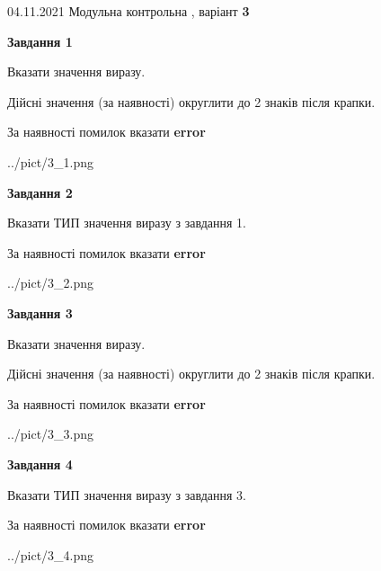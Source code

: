 \documentclass[11pt, ukrainian]{article}
\begin{document}
{04.11.2021 Модульна контрольна , варіант  \No \textbf { 3 }\par}
{
\begin {large}
{\begin {center}\textbf{Завдання 1}\end {center}}\par
Вказати значення виразу. \par
Дійсні значення (за наявності) округлити до 2 знаків після крапки. \par
За наявності помилок вказати \textbf{error}

\begin{center}
	{../pict/3_1.png}
\end{center}
\newpage

{\begin {center}\textbf{Завдання 2}\end {center}}\par
Вказати ТИП значення виразу з завдання 1. \par
За наявності помилок вказати \textbf{error}

\begin{center}
	{../pict/3_2.png}
\end{center}
\newpage

{\begin {center}\textbf{Завдання 3}\end {center}}\par
Вказати значення виразу. \par
Дійсні значення (за наявності) округлити до 2 знаків після крапки. \par
За наявності помилок вказати \textbf{error}

\begin{center}
	{../pict/3_3.png}
\end{center}
\newpage

{\begin {center}\textbf{Завдання 4}\end {center}}\par
Вказати ТИП значення виразу з завдання 3. \par
За наявності помилок вказати \textbf{error}

\begin{center}
	{../pict/3_4.png}
\end{center}
\newpage


\end{large}}
\end{document}

